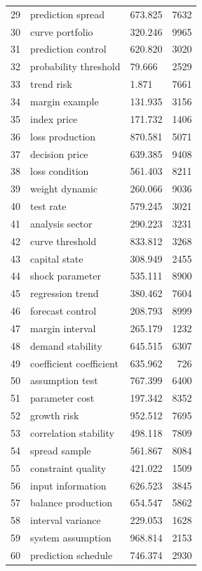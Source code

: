 \documentclass[11pt]{report}
\begin{document}
\begin{longtable}{rllr}
29 & prediction spread & 673.825 & 7632 \\
30 & curve portfolio & 320.246 & 9965 \\
31 & prediction control & 620.820 & 3020 \\
32 & probability threshold & 79.666 & 2529 \\
33 & trend risk & 1.871 & 7661 \\
34 & margin example & 131.935 & 3156 \\
35 & index price & 171.732 & 1406 \\
36 & loss production & 870.581 & 5071 \\
37 & decision price & 639.385 & 9408 \\
38 & loss condition & 561.403 & 8211 \\
39 & weight dynamic & 260.066 & 9036 \\
40 & test rate & 579.245 & 3021 \\
41 & analysis sector & 290.223 & 3231 \\
42 & curve threshold & 833.812 & 3268 \\
43 & capital state & 308.949 & 2455 \\
44 & shock parameter & 535.111 & 8900 \\
45 & regression trend & 380.462 & 7604 \\
46 & forecast control & 208.793 & 8999 \\
47 & margin interval & 265.179 & 1232 \\
48 & demand stability & 645.515 & 6307 \\
49 & coefficient coefficient & 635.962 & 726 \\
50 & assumption test & 767.399 & 6400 \\
51 & parameter cost & 197.342 & 8352 \\
52 & growth risk & 952.512 & 7695 \\
53 & correlation stability & 498.118 & 7809 \\
54 & spread sample & 561.867 & 8084 \\
55 & constraint quality & 421.022 & 1509 \\
56 & input information & 626.523 & 3845 \\
57 & balance production & 654.547 & 5862 \\
58 & interval variance & 229.053 & 1628 \\
59 & system assumption & 968.814 & 2153 \\
60 & prediction schedule & 746.374 & 2930 \\
\end{longtable}
\end{document}
